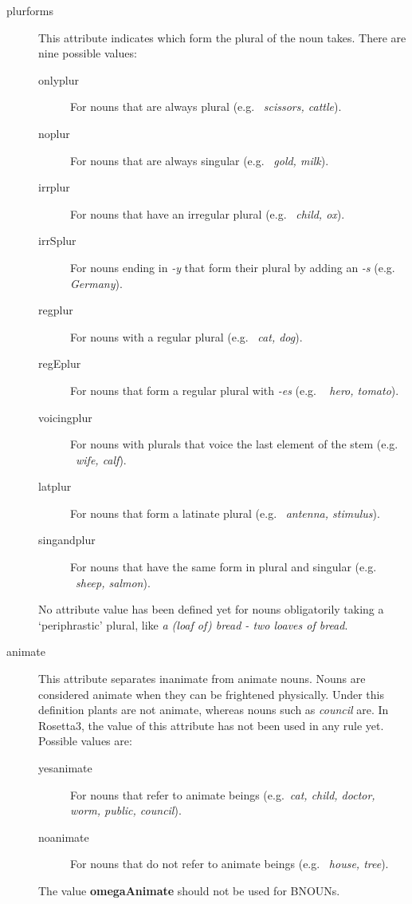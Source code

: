 \begin{description}
\item[plurforms] This attribute indicates which form the plural of the noun 
takes. There are nine possible values:
\begin{description}
  \item [onlyplur] For nouns that are always plural (e.g. \ {\em scissors, 
cattle\/}).
  \item [noplur] For nouns that are always singular (e.g. \ {\em gold, 
milk\/}).
  \item [irrplur] For nouns that have an irregular plural (e.g. \ {\em child, 
ox\/}).
  \item [irrSplur] For nouns 
ending in {\em -y} that form their plural by adding an {\em -s} (e.g. \ {\em 
Germany\/}).
  \item [regplur] For nouns with a regular plural (e.g. \ {\em cat, dog\/}).
  \item [regEplur] For nouns that form a regular plural with {\em -es} (e.g. \ {\em 
hero, tomato\/}).
  \item [voicingplur] For nouns with plurals that voice the last element of the 
stem (e.g. \ {\em wife, calf\/}).
  \item [latplur] For nouns that form a latinate plural (e.g. \ {\em antenna, 
stimulus\/}).
  \item [singandplur] For nouns that have the same form in plural and 
singular (e.g. \ {\em sheep, salmon\/}).
\end{description}
 No attribute value has been defined yet for nouns 
obligatorily taking a `periphrastic' plural, like {\em a (loaf of) bread - two 
loaves of bread\/}. 

\item[animate] This attribute separates inanimate from animate nouns. Nouns are 
considered animate when they can be frightened physically. Under this 
definition plants are not animate, whereas nouns such as {\em council} are. In 
Rosetta3, the value of this attribute has not been used in any rule yet. 
Possible values are:
  \begin{description}
  \item[yesanimate] For nouns that refer to animate beings (e.g.\ {\em cat, 
child, doctor, worm, public, council\/}).
  \item[noanimate] For nouns that do not refer to animate beings (e.g.\ {\em 
house, tree\/}).
  \end{description}
The value {\bf omegaAnimate} should not be used for BNOUNs.


\end{description}

